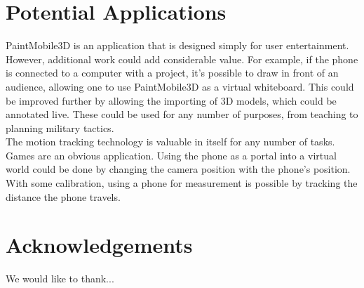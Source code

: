\documentclass{chi-ext}
\begin{document}
\section{Potential Applications}

PaintMobile3D is an application that is designed simply for user entertainment. However, additional work could add
considerable value. For example, if the phone is connected to a computer with a project, it's possible to draw in front of an audience,
allowing one to use PaintMobile3D as a virtual whiteboard. This could be improved further by allowing the importing of
3D models, which could be annotated live. These could be used for any number of purposes, from teaching to planning military tactics.
\\
The motion tracking technology is valuable in itself for any number of tasks. Games are an obvious application. Using the phone as a
portal into a virtual world could be done by changing the camera position with the phone's position. With some calibration, using a
phone for measurement is possible by tracking the distance the phone travels.


\section{Acknowledgements}

We would like to thank...

\balance



\end{document}
